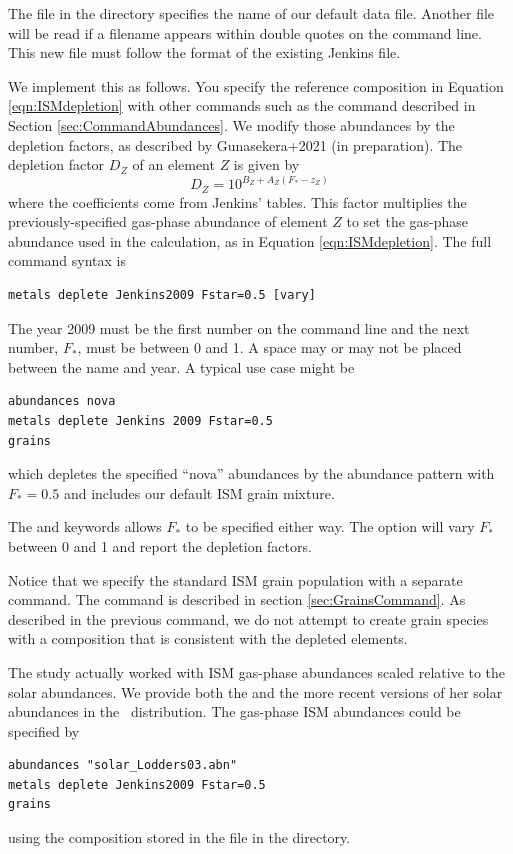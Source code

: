 The  file in the  directory
specifies the name of our default data file.  
Another file will be read if a filename appears within double quotes
on the command line.
This new file must follow the format of the existing Jenkins file.

We implement this as follows.
You specify the reference composition in Equation \ref{eqn:ISMdepletion} with other commands such as the
 command described in Section \ref{sec:CommandAbundances}.
We  modify those abundances by
the \citet{2009ApJ...700.1299J}  depletion factors, as described by
Gunasekera+2021 (in preparation).  
The depletion factor $D_Z$ of an element $Z$ is given by
\begin{equation}
D_Z = 10^{B_Z + A_Z (F_* - z_Z)}
\end{equation}
where the coefficients come from Jenkins' tables.
This factor multiplies the previously-specified gas-phase abundance of element $Z$
to set the gas-phase abundance used in the calculation, as in Equation \ref{eqn:ISMdepletion}.
The full command syntax is
\begin{verbatim}
metals deplete Jenkins2009 Fstar=0.5 [vary]
\end{verbatim}
The year 2009 must be the first number on the command line and the next number, $F_*$,
must be between 0 and 1.
A space may or may not be placed between the name and year.
A typical use case might be
\begin{verbatim}
abundances nova
metals deplete Jenkins 2009 Fstar=0.5
grains
\end{verbatim}
which depletes the specified ``nova'' abundances by the \citet{2009ApJ...700.1299J}
abundance pattern with $F_* = 0.5$ and includes our default ISM grain mixture.

The  and  keywords allows
$F_*$ to be specified either way.
 The  option will vary $F_*$ between 0 and 1 and report the depletion factors.

Notice that we specify the standard ISM grain population with a separate 
  command.
The   command is described in section \ref{sec:GrainsCommand}.
As described in the previous  command, we do not 
attempt to create grain species with a composition that is consistent with the depleted elements.

The \citet{2009ApJ...700.1299J}   study actually worked with ISM gas-phase abundances scaled
relative to the \citet{Lodders2003} solar abundances.
We provide both the \citet{Lodders2003}  and the more recent \citet{Lodders2009} versions of her solar abundances in the \Cloudy\ distribution.  
The \citet{2009ApJ...700.1299J} gas-phase ISM abundances could be specified by 
\begin{verbatim}
abundances "solar_Lodders03.abn"
metals deplete Jenkins2009 Fstar=0.5
grains
\end{verbatim}
using the composition stored in the  file 
in the  directory.

